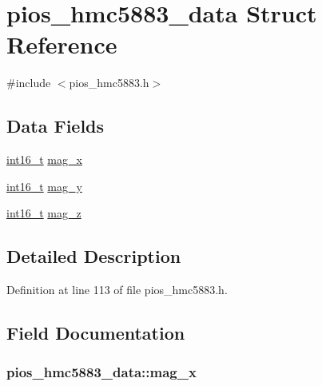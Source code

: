 \hypertarget{structpios__hmc5883__data}{\section{pios\-\_\-hmc5883\-\_\-data Struct Reference}
\label{structpios__hmc5883__data}
}


{\ttfamily \#include $<$pios\-\_\-hmc5883.\-h$>$}

\subsection*{Data Fields}
\begin{DoxyCompactItemize}
\item 
\hyperlink{stdint_8h_aa343fa3b3d06292b959ffdd4c4703b06}{int16\-\_\-t} \hyperlink{structpios__hmc5883__data_a085be4ca2f59dcffe255094fe12d36f7}{mag\-\_\-x}
\item 
\hyperlink{stdint_8h_aa343fa3b3d06292b959ffdd4c4703b06}{int16\-\_\-t} \hyperlink{structpios__hmc5883__data_a707b18d498bd59bdee07421a6010c616}{mag\-\_\-y}
\item 
\hyperlink{stdint_8h_aa343fa3b3d06292b959ffdd4c4703b06}{int16\-\_\-t} \hyperlink{structpios__hmc5883__data_a03ffa9851eac28313edf9c6cc0a9cdd0}{mag\-\_\-z}
\end{DoxyCompactItemize}


\subsection{Detailed Description}


Definition at line 113 of file pios\-\_\-hmc5883.\-h.



\subsection{Field Documentation}
\hypertarget{structpios__hmc5883__data_a085be4ca2f59dcffe255094fe12d36f7}{
\subsubsection[{mag\-\_\-x}]{ pios\-\_\-hmc5883\-\_\-data\-::mag\-\_\-x}}\label{structpios__hmc5883__data_a085be4ca2f59dcffe255094fe12d36f7}


